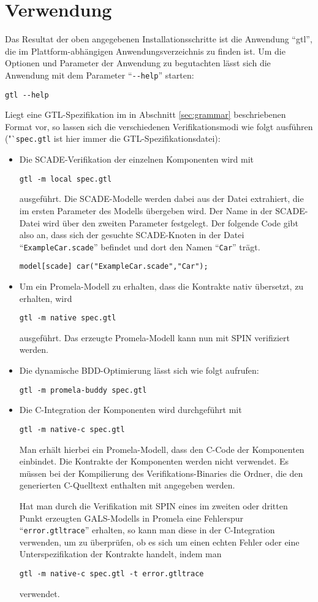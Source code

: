 \section{Verwendung}
Das Resultat der oben angegebenen Installationsschritte ist die Anwendung "`gtl"', die im Plattform-abhängigen Anwendungsverzeichnis zu finden ist.
Um die Optionen und Parameter der Anwendung zu begutachten lässt sich die Anwendung mit dem Parameter "`\verb|--help|"' starten:
\begin{verbatim}
gtl --help
\end{verbatim}
Liegt eine GTL-Spezifikation im in Abschnitt \ref{sec:grammar} beschriebenen Format vor, so lassen sich die verschiedenen Verifikationsmodi wie folgt ausführen ("`\verb|spec.gtl| ist hier immer die GTL-Spezifikationsdatei):
\begin{itemize}
\item Die SCADE-Verifikation der einzelnen Komponenten wird mit
\begin{verbatim}
gtl -m local spec.gtl
\end{verbatim}
ausgeführt.
Die SCADE-Modelle werden dabei aus der Datei extrahiert, die im ersten Parameter des Modells übergeben wird.
Der Name in der SCADE-Datei wird über den zweiten Parameter festgelegt.
Der folgende Code gibt also an, dass sich der gesuchte SCADE-Knoten in der Datei "`\verb|ExampleCar.scade|"' befindet und dort den Namen "`\verb|Car|"' trägt.
\begin{lstlisting}[language=gtl]
model[scade] car("ExampleCar.scade","Car");
\end{lstlisting}
\item Um ein Promela-Modell zu erhalten, dass die Kontrakte nativ übersetzt, zu erhalten, wird
\begin{verbatim}
gtl -m native spec.gtl
\end{verbatim}
ausgeführt.
Das erzeugte Promela-Modell kann nun mit SPIN verifiziert werden.
\item Die dynamische BDD-Optimierung lässt sich wie folgt aufrufen:
\begin{verbatim}
gtl -m promela-buddy spec.gtl
\end{verbatim}
\item Die C-Integration der Komponenten wird durchgeführt mit
\begin{verbatim}
gtl -m native-c spec.gtl
\end{verbatim}
Man erhält hierbei ein Promela-Modell, dass den C-Code der Komponenten einbindet.
Die Kontrakte der Komponenten werden nicht verwendet.
Es müssen bei der Kompilierung des Verifikations-Binaries die Ordner, die den generierten C-Quelltext enthalten mit angegeben werden.


Hat man durch die Verifikation mit SPIN eines im zweiten oder dritten Punkt erzeugten GALS-Modells in Promela eine Fehlerspur "`\verb|error.gtltrace|"' erhalten, so kann man diese in der C-Integration verwenden, um zu überprüfen, ob es sich um einen echten Fehler oder eine Unterspezifikation der Kontrakte handelt, indem man
\begin{verbatim}
gtl -m native-c spec.gtl -t error.gtltrace
\end{verbatim}
verwendet.
\end{itemize}
